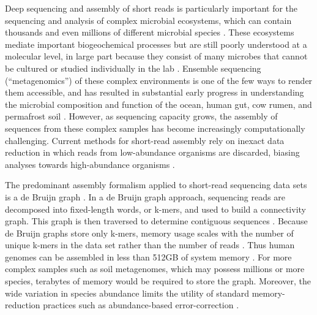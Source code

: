 \documentclass{pnastwo}
\begin{document}
\begin{article}
Deep sequencing and assembly of short reads is particularly important
for the sequencing and analysis of complex microbial ecosystems, which
can contain thousands and even millions of different microbial species
\cite{pubmed20195499,pubmed16123304}.  These ecosystems mediate
important biogeochemical processes but are still poorly understood at
a molecular level, in large part because they consist of many microbes
that cannot be cultured or studied individually in the lab
\cite{pubmed20195499,nrcbook}.  Ensemble sequencing (``metagenomics'') of
these complex environments is one of the few ways to render them
accessible, and has resulted in substantial early progress in
understanding the microbial composition and function of the ocean,
human gut, cow rumen, and permafrost soil
\cite{metahit,rumen,sargasso,permafrost}.  However, as sequencing
capacity grows, the assembly of sequences from these complex samples
has become increasingly computationally challenging.  Current methods
for short-read assembly rely on inexact data reduction in which reads
from low-abundance organisms are discarded, biasing analyses towards
high-abundance organisms \cite{metahit,rumen,permafrost}.


The predominant assembly formalism applied to short-read sequencing
data sets is a de Bruijn graph
\cite{pubmed11504945,pubmed20211242,pubmed22068540}.  In a de Bruijn
graph approach, sequencing reads are decomposed into fixed-length
words, or k-mers, and used to build a connectivity graph.  This graph
is then traversed to determine contiguous sequences
\cite{pubmed22068540}.  Because de Bruijn graphs store only k-mers,
memory usage scales with the number of unique k-mers in the data set
rather than the number of reads \cite{succinct,pubmed22068540}.  Thus
human genomes can be assembled in less than 512GB of system memory
\cite{pmid21187386}.  For more complex samples such as soil
metagenomes, which may possess millions or more species, terabytes of
memory would be required to store the graph.  Moreover, the wide
variation in species abundance limits the utility of standard
memory-reduction practices such as abundance-based error-correction
\cite{pubmed21114842}.


\end{article}
\end{document}

